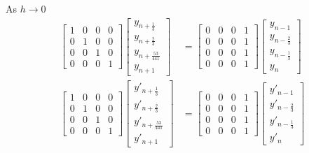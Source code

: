 \documentclass[12pt]{report}
\begin{document}
As $h \rightarrow 0$
\begin{align}
\begin{bmatrix}
1 & 0 & 0 & 0\\
0 & 1 & 0 & 0\\
0 & 0 & 1 & 0\\
0 & 0 & 0 & 1
\end{bmatrix}
\begin{bmatrix}
y_{n+\frac{1}{3}}\\ y_{n+\frac{2}{3}} \\ y_{n+\frac{53}{441}} \\ y_{n+1}
\end{bmatrix}
&=\begin{bmatrix}
0 & 0 & 0 & 1\\
0 & 0 & 0 & 1\\
0 & 0 & 0 & 1\\
0 & 0 & 0 & 1
\end{bmatrix}\begin{bmatrix}
y_{n-1}\\ y_{n-\frac{2}{3}} \\ y_{n-\frac{1}{3}} \\ y_{n}
\end{bmatrix} \\
\begin{bmatrix}
1 & 0 & 0 & 0\\
0 & 1 & 0 & 0\\
0 & 0 & 1 & 0\\
0 & 0 & 0 & 1
\end{bmatrix}
\begin{bmatrix}
y'_{n+\frac{1}{3}}\\ y'_{n+\frac{2}{3}} \\ y'_{n+\frac{53}{441}} \\ y'_{n+1}
\end{bmatrix}
&= \begin{bmatrix}
0 & 0 & 0 & 1\\
0 & 0 & 0 & 1\\
0 & 0 & 0 & 1\\
0 & 0 & 0 & 1
\end{bmatrix}\begin{bmatrix}
y'_{n-1}\\ y'_{n-\frac{2}{3}} \\ y'_{n-\frac{1}{3}} \\ y'_{n}
\end{bmatrix}
\end{align}
\end{document}

